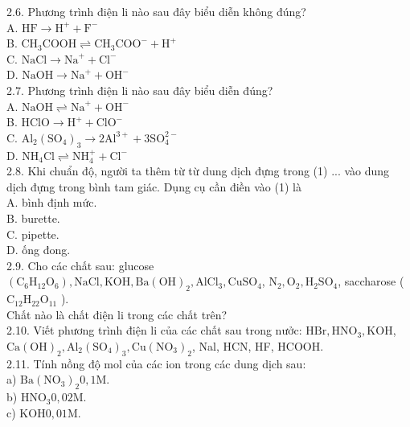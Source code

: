 \documentclass[10pt]{article}
\begin{document}
2.6. Phương trình điện li nào sau đây biểu diễn không đúng?\\
A. $\mathrm{HF} \rightarrow \mathrm{H}^{+}+\mathrm{F}^{-}$\\
B. $\mathrm{CH}_{3} \mathrm{COOH} \rightleftharpoons \mathrm{CH}_{3} \mathrm{COO}^{-}+\mathrm{H}^{+}$\\
C. $\mathrm{NaCl} \rightarrow \mathrm{Na}^{+}+\mathrm{Cl}^{-}$\\
D. $\mathrm{NaOH} \rightarrow \mathrm{Na}^{+}+\mathrm{OH}^{-}$\\
2.7. Phương trình điện li nào sau đây biểu diễn đúng?\\
A. $\mathrm{NaOH} \rightleftharpoons \mathrm{Na}^{+}+\mathrm{OH}^{-}$\\
B. $\mathrm{HClO} \rightarrow \mathrm{H}^{+}+\mathrm{ClO}^{-}$\\
C. $\mathrm{Al}_{2}\left(\mathrm{SO}_{4}\right)_{3} \rightarrow 2 \mathrm{Al}^{3+}+3 \mathrm{SO}_{4}^{2-}$\\
D. $\mathrm{NH}_{4} \mathrm{Cl} \rightleftharpoons \mathrm{NH}_{4}^{+}+\mathrm{Cl}^{-}$\\
2.8. Khi chuẩn độ, người ta thêm từ từ dung dịch đựng trong (1) ... vào dung dịch đựng trong bình tam giác. Dụng cụ cần điền vào (1) là\\
A. bình định mức.\\
B. burette.\\
C. pipette.\\
D. ống đong.\\
2.9. Cho các chất sau: glucose $\left(\mathrm{C}_{6} \mathrm{H}_{12} \mathrm{O}_{6}\right), \mathrm{NaCl}, \mathrm{KOH}, \mathrm{Ba}(\mathrm{OH})_{2}, \mathrm{AlCl}_{3}, \mathrm{CuSO}_{4}$, $\mathrm{N}_{2}, \mathrm{O}_{2}, \mathrm{H}_{2} \mathrm{SO}_{4}$, saccharose ( $\mathrm{C}_{12} \mathrm{H}_{22} \mathrm{O}_{11}$ ).\\
Chất nào là chất điện li trong các chất trên?\\
2.10. Viết phương trình điện li của các chất sau trong nưởc: $\mathrm{HBr}, \mathrm{HNO}_{3}, \mathrm{KOH}$, $\mathrm{Ca}(\mathrm{OH})_{2}, \mathrm{Al}_{2}\left(\mathrm{SO}_{4}\right)_{3}, \mathrm{Cu}\left(\mathrm{NO}_{3}\right)_{2}$, Nal, HCN, HF, HCOOH.\\
2.11. Tính nồng độ mol của các ion trong các dung dịch sau:\\
a) $\mathrm{Ba}\left(\mathrm{NO}_{3}\right)_{2} 0,1 \mathrm{M}$.\\
b) $\mathrm{HNO}_{3} 0,02 \mathrm{M}$.\\
c) $\mathrm{KOH} 0,01 \mathrm{M}$.\\
\end{document}
